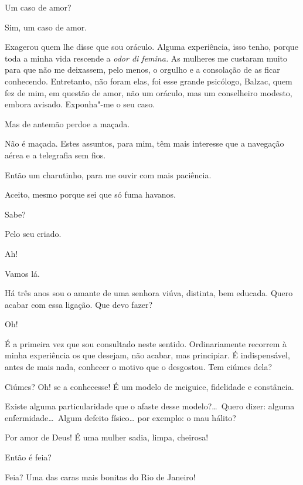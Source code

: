   Um caso de amor?

  Sim, um caso de amor.

  Exagerou quem lhe disse que sou oráculo. Alguma
experiência, isso tenho, porque toda a minha vida rescende a
\textit{odor di femina.} As mulheres me custaram muito para que não me
deixassem, pelo menos, o orgulho e a consolação de as ficar conhecendo.
Entretanto, não foram elas, foi esse grande psicólogo, Balzac, quem fez
de mim, em questão de amor, não um oráculo, mas um conselheiro modesto,
embora avisado. Exponha"-me o seu caso.

  Mas de antemão perdoe a maçada.

  Não é maçada. Estes assuntos, para mim, têm mais
interesse que a navegação aérea e a telegrafia sem fios.

  Então um charutinho, para me ouvir com mais
paciência. 

   Aceito, mesmo porque sei que
só fuma havanos.

  Sabe?

  Pelo seu criado.

  Ah! 

  Vamos lá.

  Há três anos sou o amante de uma senhora
viúva, distinta, bem educada. Quero acabar com essa ligação. Que devo
fazer?

  Oh!

  É a primeira vez que sou consultado neste sentido.
Ordinariamente recorrem à minha experiência os que desejam, não acabar,
mas principiar. É indispensável, antes de mais nada, conhecer o motivo
que o desgostou. Tem ciúmes dela?

  Ciúmes? Oh! se a conhecesse! É um modelo de
meiguice, fidelidade e constância.

  Existe alguma particularidade que o afaste desse
modelo?\ldots\ Quero dizer: alguma enfermidade\ldots\ Algum defeito físico\ldots
por exemplo: o mau hálito?

  Por amor de Deus! É uma mulher sadia, limpa,
cheirosa!

  Então é feia?

  Feia? Uma das caras mais bonitas do Rio de
Janeiro!

